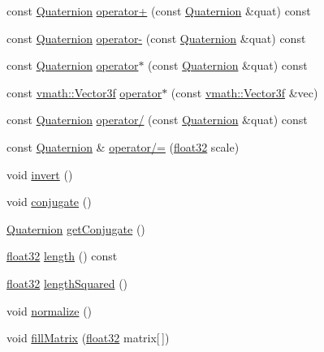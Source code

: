 \begin{DoxyCompactItemize}
\item 
const \hyperlink{classicee_1_1engine_1_1Quaternion}{Quaternion} \hyperlink{classicee_1_1engine_1_1Quaternion_a7320af2f418e002be6fb4c02618b2003}{operator+} (const \hyperlink{classicee_1_1engine_1_1Quaternion}{Quaternion} \&quat) const 
\item 
const \hyperlink{classicee_1_1engine_1_1Quaternion}{Quaternion} \hyperlink{classicee_1_1engine_1_1Quaternion_a5c0407a4a5b3e1dcd0f34c2f58a4e863}{operator-\/} (const \hyperlink{classicee_1_1engine_1_1Quaternion}{Quaternion} \&quat) const 
\item 
const \hyperlink{classicee_1_1engine_1_1Quaternion}{Quaternion} \hyperlink{classicee_1_1engine_1_1Quaternion_ae74d3ee9e8a643ef88276fddd6d1ff48}{operator$\ast$} (const \hyperlink{classicee_1_1engine_1_1Quaternion}{Quaternion} \&quat) const 
\item 
const \hyperlink{classvmath_1_1Vector3f}{vmath::Vector3f} \hyperlink{classicee_1_1engine_1_1Quaternion_abc5ee696e09b025d38d513d7e106f0d7}{operator$\ast$} (const \hyperlink{classvmath_1_1Vector3f}{vmath::Vector3f} \&vec)
\item 
const \hyperlink{classicee_1_1engine_1_1Quaternion}{Quaternion} \hyperlink{classicee_1_1engine_1_1Quaternion_aeeec9056b9459d2d05060f735c8c23fc}{operator/} (const \hyperlink{classicee_1_1engine_1_1Quaternion}{Quaternion} \&quat) const 
\item 
const \hyperlink{classicee_1_1engine_1_1Quaternion}{Quaternion} \& \hyperlink{classicee_1_1engine_1_1Quaternion_a32a6406b0de790846aad43f0928cc4c4}{operator/=} (\hyperlink{namespacecompatibility_a32a2d006ac2172c0f859370287f0104c}{float32} scale)
\item 
void \hyperlink{classicee_1_1engine_1_1Quaternion_aaf51b47692013bf7a6495595f6d21533}{invert} ()
\item 
void \hyperlink{classicee_1_1engine_1_1Quaternion_a4e9d4d824905f6362220fa2c57e0e067}{conjugate} ()
\item 
\hyperlink{classicee_1_1engine_1_1Quaternion}{Quaternion} \hyperlink{classicee_1_1engine_1_1Quaternion_a9c232bebd7c401f462b10f091d957d4c}{getConjugate} ()
\item 
\hyperlink{namespacecompatibility_a32a2d006ac2172c0f859370287f0104c}{float32} \hyperlink{classicee_1_1engine_1_1Quaternion_a0eb2c4fdcaaaef963fe019ba788683a1}{length} () const 
\item 
\hyperlink{namespacecompatibility_a32a2d006ac2172c0f859370287f0104c}{float32} \hyperlink{classicee_1_1engine_1_1Quaternion_ac4cbb03886f6489404441cbcab9e18ad}{lengthSquared} ()
\item 
void \hyperlink{classicee_1_1engine_1_1Quaternion_acc40a99765d9cd15ad134d287702d648}{normalize} ()
\item 
void \hyperlink{classicee_1_1engine_1_1Quaternion_ade7147ca7516d59a194f075fe07b64d7}{fillMatrix} (\hyperlink{namespacecompatibility_a32a2d006ac2172c0f859370287f0104c}{float32} matrix\mbox{[}$\,$\mbox{]})
\end{DoxyCompactItemize}


